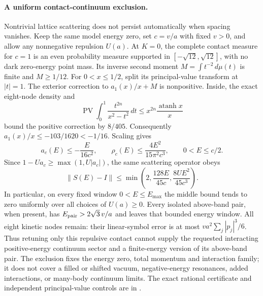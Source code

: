 \paragraph{A uniform contact-continuum exclusion.}
Nontrivial lattice scattering does not persist automatically when spacing
vanishes. Keep the same model energy zero, set $c=v/a$ with fixed $v>0$,
and allow any nonnegative repulsion $U(a)$. At $K=0$, the complete contact
measure for $c=1$ is an even probability measure supported in
$[-\sqrt{12},\sqrt{12}]$, with no dark zero-energy point mass.
Its inverse second moment $M=\int t^{-2}\,d\mu(t)$ is finite and
$M\ge1/12$. For $0<x\le1/2$, split its principal-value transform at
$|t|=1$. The exterior correction to $a_1(x)/x+M$ is nonpositive.
Inside, the exact eight-node density and
\[
 \operatorname{PV}\int_0^1\frac{t^{2n}}{x^2-t^2}\,dt
 \le x^{2n}\frac{\operatorname{atanh}x}{x}
\]
bound the positive correction by $8/405$. Consequently
$a_1(x)/x\le-103/1620<-1/16$. Scaling gives
\[
 a_c(E)\le-\frac{E}{16c^2},\qquad
 \rho_c(E)\le\frac{4E^2}{15\pi^2c^3},\qquad 0<E\le c/2.
\]
Since $1-Ua_c\ge\max(1,U|a_c|)$, the same scattering operator obeys
\[
 \|S(E)-I\|\le
 \min\!\left(2,\frac{128E}{45c},\frac{8UE^2}{45c^3}\right).
\]
In particular, on every fixed window $0<E\le E_{\max}$ the middle
bound tends to zero uniformly over all choices of $U(a)\ge0$.
Every isolated above-band pair, when present, has
$E_{\rm pair}>2\sqrt3\,v/a$ and leaves that bounded energy window.
All eight kinetic nodes remain: their linear-symbol error is at most
$va^2\sum_j|p_j|^3/6$. Thus retuning only this repulsive contact cannot
supply the requested interacting positive-energy continuum sector and a
finite-energy version of its above-band pair. The exclusion fixes the
energy zero, total momentum and interaction family; it does not cover a
filled or shifted vacuum, negative-energy resonances, added interactions,
or many-body continuum limits. The exact rational certificate and
independent principal-value controls are in
.
